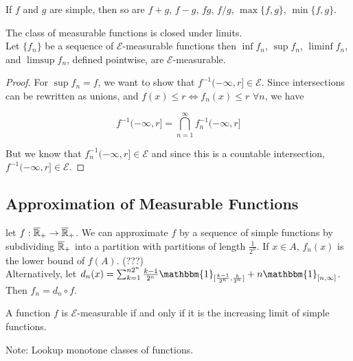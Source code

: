 \documentclass[english, course]{Notes}
\begin{document}
\begin{fact}
If $f$ and $g$ are simple, then so are $f+g$, $f-g$, $fg$, $f/g$, $\max\{f, g\}$, $\min\{f, g\}$.\\
\end{fact}


\begin{theorem}
The class of measurable functions is closed under limits.\\

Let $\{f_n\}$ be a sequence of $\mathcal{E}$-measurable functions then $\inf f_n$, $\sup f_n$, $\liminf f_n$, and $\limsup f_n$, defined pointwise, are $\mathcal{E}$-measurable.
\end{theorem}

\begin{proof}
For $\sup f_n = f$, we want to show that $f^{-1}(-\infty, r] \in \mathcal{E}$. Since intersections can be rewritten as unions, and $f(x) \leq r \iff f_n(x) \leq r$ $\forall n$, we have

\[f^{-1}(-\infty, r] = \bigcap^\infty_{n=1} f^{-1}_n(-\infty, r]\]

But we know that $f^{-1}_n(-\infty, r] \in \mathcal{E}$ and since this is a countable intersection, $f^{-1}(-\infty, r] \in \mathcal{E}$.
\end{proof}

\subsection{Approximation of Measurable Functions}

let $f: \overline{\mathbb{R}}_+ \to \overline{\mathbb{R}}_+$. We can approximate $f$ by a sequence of simple functions by subdividing $\overline{\mathbb{R}}_+$ into a partition with partitions of length $\frac{1}{2^n}$. If $x \in A$, $f_n(x)$ is the lower bound of $f(A)$. (???)\\

Alternatively, let $d_n(x) = \sum_{k = 1}^{n2^n} \frac{k-1}{2^n} \mathbbm{1}_{[\frac{k-1}{2^n}, \frac{k}{2^n}]} + n \mathbbm{1}_{[n, \infty]}$. Then $f_n = d_n \circ f$.\\

\begin{theorem}
A function $f$ is $\mathcal{E}$-measurable if and only if it is the increasing limit of simple functions.\\
\end{theorem}

Note: Lookup monotone classes of functions.
\end{document}
